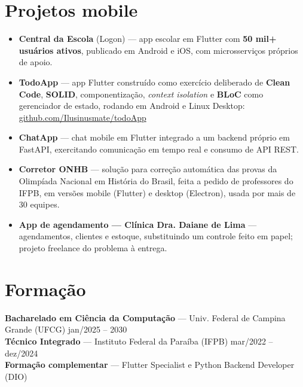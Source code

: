 \documentclass[10.5pt,a4paper]{article}
\begin{document}
\section*{Projetos mobile}
\begin{itemize}
  \item \textbf{Central da Escola} (Logon) --- app escolar em Flutter com \textbf{50 mil+ usuários
        ativos}, publicado em Android e iOS, com microsserviços próprios de apoio.
  \item \textbf{TodoApp} --- app Flutter construído como exercício deliberado de \textbf{Clean
        Code}, \textbf{SOLID}, componentização, \textit{context isolation} e \textbf{BLoC} como
        gerenciador de estado, rodando em Android e Linux Desktop:
        \href{https://github.com/Ilusinusmate/todoApp}{github.com/Ilusinusmate/\allowbreak todoApp}
  \item \textbf{ChatApp} --- chat mobile em Flutter integrado a um backend próprio em FastAPI,
        exercitando comunicação em tempo real e consumo de API REST.
  \item \textbf{Corretor ONHB} --- solução para correção automática das provas da Olimpíada Nacional
        em História do Brasil, feita a pedido de professores do IFPB, em versões mobile (Flutter) e
        desktop (Electron), usada por mais de 30 equipes.
  \item \textbf{App de agendamento --- Clínica Dra. Daiane de Lima} --- agendamentos, clientes e
        estoque, substituindo um controle feito em papel; projeto freelance do problema à entrega.
\end{itemize}

\section*{Formação}
\textbf{Bacharelado em Ciência da Computação} --- Univ. Federal de Campina Grande (UFCG)
\hfill jan/2025 -- 2030\\
\textbf{Técnico Integrado} --- Instituto Federal da Paraíba (IFPB) \hfill mar/2022 -- dez/2024\\
\textbf{Formação complementar} --- Flutter Specialist e Python Backend Developer (DIO)

\end{document}

